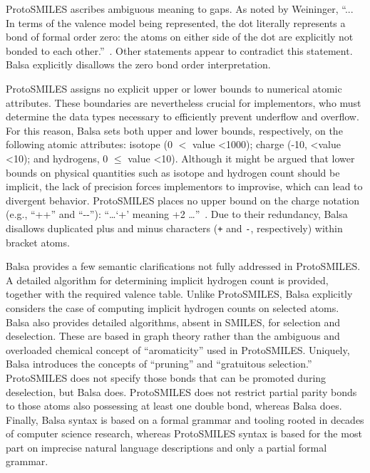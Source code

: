 \documentclass{article}
\def\ttt{\texttt}
\begin{document}
ProtoSMILES ascribes ambiguous meaning to gaps. As noted by Weininger, \enquote{... In terms of the valence model being represented, the dot literally represents a bond of formal order zero: the atoms on either side of the dot are explicitly not bonded to each other.}~\cite[p.~88]{weininger:2003}. Other statements appear to contradict this statement. Balsa explicitly disallows the zero bond order interpretation.

ProtoSMILES assigns no explicit upper or lower bounds to numerical atomic attributes. These boundaries are nevertheless crucial for implementors, who must determine the data types necessary to efficiently prevent underflow and overflow. For this reason, Balsa sets both upper and lower bounds, respectively, on the following atomic attributes: isotope (0 $<$ value \textless 1000); charge (-10, \textless value \textless 10); and hydrogens, 0 $\leq$ value \textless 10). Although it might be argued that lower bounds on physical quantities such as isotope and hydrogen count should be implicit, the lack of precision forces implementors to improvise, which can lead to divergent behavior. ProtoSMILES places no upper bound on the charge notation (e.g., \enquote{++} and \enquote{-{}-}): \enquote{\dots \enquote{+} meaning +2 \dots}~\cite[p.~94]{weininger:2003}. Due to their redundancy, Balsa disallows duplicated plus and minus characters (\ttt{+} and \ttt{-}, respectively) within bracket atoms.

Balsa provides a few semantic clarifications not fully addressed in ProtoSMILES. A detailed algorithm for determining implicit hydrogen count is provided, together with the required valence table. Unlike ProtoSMILES, Balsa explicitly considers the case of computing implicit hydrogen counts on selected atoms. Balsa also provides detailed algorithms, absent in SMILES, for selection and deselection. These are based in graph theory rather than the ambiguous and overloaded chemical concept of \enquote{aromaticity} used in ProtoSMILES. Uniquely, Balsa introduces the concepts of \enquote{pruning} and \enquote{gratuitous selection.} ProtoSMILES does not specify those bonds that can be promoted during deselection, but Balsa does. ProtoSMILES does not restrict partial parity bonds to those atoms also possessing at least one double bond, whereas Balsa does. Finally, Balsa syntax is based on a formal grammar and tooling rooted in decades of computer science research, whereas ProtoSMILES syntax is based for the most part on imprecise natural language descriptions and only a partial formal grammar.
\end{document}
